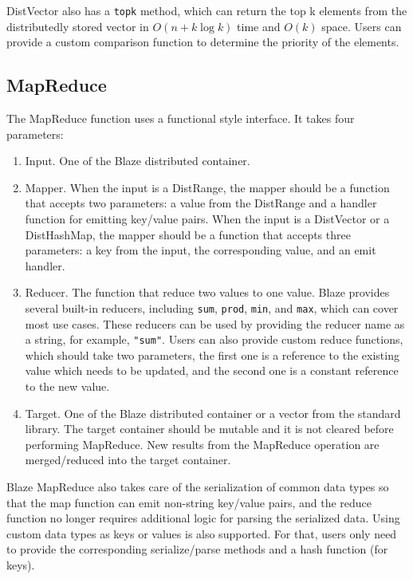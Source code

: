 DistVector also has a \lstinline{topk} method, which can return the top k elements from the distributedly stored vector in $O(n+k\log k)$ time and $O(k)$ space.
Users can provide a custom comparison function to determine the priority of the elements.

\subsection{MapReduce}

The MapReduce function uses a functional style interface.
It takes four parameters:
\begin{enumerate}
    \item Input. One of the Blaze distributed container.
    \item Mapper. When the input is a DistRange, the mapper should be a function that accepts two parameters: a value from the DistRange and a handler function for emitting key/value pairs.
    When the input is a DistVector or a DistHashMap, the mapper should be a function that accepts three parameters: a key from the input, the corresponding value, and an emit handler.
    \item Reducer. The function that reduce two values to one value.
    Blaze provides several built-in reducers, including \lstinline{sum}, \lstinline{prod}, \lstinline{min}, and \lstinline{max}, which can cover most use cases.
    These reducers can be used by providing the reducer name as a string, for example, \lstinline{"sum"}.
    Users can also provide custom reduce functions, which should take two parameters, the first one is a reference to the existing value which needs to be updated, and the second one is a constant reference to the new value.
    \item Target. One of the Blaze distributed container or a vector from the standard library.
    The target container should be mutable and it is not cleared before performing MapReduce.
    New results from the MapReduce operation are merged/reduced into the target container.
\end{enumerate}

Blaze MapReduce also takes care of the serialization of common data types so that the map function can emit non-string key/value pairs, and the reduce function no longer requires additional logic for parsing the serialized data.
Using custom data types as keys or values is also supported. For that, users only need to provide the corresponding serialize/parse methods and a hash function (for keys).

